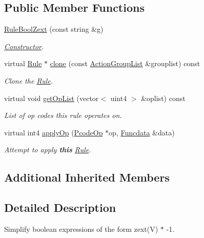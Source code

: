 \subsection*{Public Member Functions}
\begin{DoxyCompactItemize}
\item 
\mbox{\hyperlink{class_rule_bool_zext_abd48faf70b2f00bccc115c43a0a65930}{Rule\+Bool\+Zext}} (const string \&g)
\begin{DoxyCompactList}\small\item\em \mbox{\hyperlink{class_constructor}{Constructor}}. \end{DoxyCompactList}\item 
virtual \mbox{\hyperlink{class_rule}{Rule}} $\ast$ \mbox{\hyperlink{class_rule_bool_zext_a481738bbe3367de5a74cc535a6fe86d5}{clone}} (const \mbox{\hyperlink{class_action_group_list}{Action\+Group\+List}} \&grouplist) const
\begin{DoxyCompactList}\small\item\em Clone the \mbox{\hyperlink{class_rule}{Rule}}. \end{DoxyCompactList}\item 
virtual void \mbox{\hyperlink{class_rule_bool_zext_a5acd5e378d1dba2e77ec6ccce4754d43}{get\+Op\+List}} (vector$<$ uint4 $>$ \&oplist) const
\begin{DoxyCompactList}\small\item\em List of op codes this rule operates on. \end{DoxyCompactList}\item 
virtual int4 \mbox{\hyperlink{class_rule_bool_zext_a167cc1b2d30a03f4efda236b63fa1838}{apply\+Op}} (\mbox{\hyperlink{class_pcode_op}{Pcode\+Op}} $\ast$op, \mbox{\hyperlink{class_funcdata}{Funcdata}} \&data)
\begin{DoxyCompactList}\small\item\em Attempt to apply {\bfseries{this}} \mbox{\hyperlink{class_rule}{Rule}}. \end{DoxyCompactList}\end{DoxyCompactItemize}
\subsection*{Additional Inherited Members}


\subsection{Detailed Description}
Simplify boolean expressions of the form zext(\+V) $\ast$ -\/1. 


